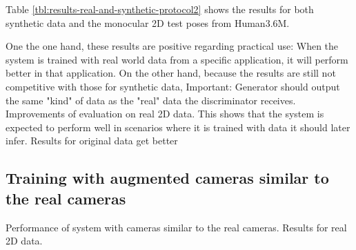 

Table \ref{tbl:results-real-and-synthetic-protocol2} shows the results for both synthetic data and the monocular 2D test poses from Human3.6M.

One the one hand, these results are positive regarding practical use:
When the system is trained with real world data from a specific application, it will perform better in that application.
On the other hand, because the results are still not competitive with those for synthetic data, 
Important: Generator should output the same "kind" of data as the "real" data the discriminator receives.
Improvements of evaluation on real 2D data. 
This shows that the system is expected to perform well in scenarios where it is trained with data it should later infer.
Results for original data get better


\subsection{Training with augmented cameras similar to the real cameras}
Performance of system with cameras similar to the real cameras.
Results for real 2D data.